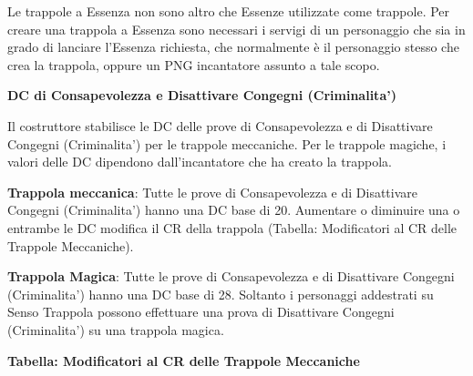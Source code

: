 \documentclass[a4paper,11pt,twoside,openany]{book}
\begin{document}
Le trappole a Essenza non sono altro che Essenze utilizzate come trappole. Per creare una trappola a Essenza sono necessari i servigi di un personaggio che sia in grado di lanciare l'Essenza richiesta, che normalmente è il personaggio stesso che crea la trappola, oppure un PNG incantatore assunto a tale scopo.

\textbf{DC di Consapevolezza e Disattivare Congegni (Criminalita')}

Il costruttore stabilisce le DC delle prove di Consapevolezza e di Disattivare Congegni (Criminalita') per le trappole meccaniche. Per le trappole magiche, i valori delle DC dipendono dall'incantatore che ha creato la trappola.

\textbf{Trappola meccanica}: Tutte le prove di Consapevolezza e di Disattivare Congegni (Criminalita') hanno una DC base di 20. Aumentare o diminuire una o entrambe le DC modifica il CR della trappola (Tabella: Modificatori al CR delle Trappole Meccaniche).

\textbf{Trappola Magica}: Tutte le prove di Consapevolezza e di Disattivare Congegni (Criminalita') hanno una DC base di 28. Soltanto i personaggi addestrati su Senso Trappola possono effettuare una prova di Disattivare Congegni (Criminalita') su una trappola magica.

\pagebreak

\textbf{Tabella: Modificatori al CR delle Trappole Meccaniche}
\end{document}
